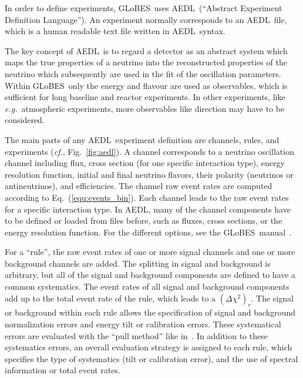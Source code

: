 \documentclass[12pt,a4paper]{article}
\newcommand{\eg}{{\it e.g.}}
\newcommand{\cf}{{\it cf.}}
\newcommand{\eq}{Eq.}
\newcommand{\fig}{Fig.}
\newcommand{\GLOBES}{{\sf GLoBES}}
\newcommand{\AEDL}{{\sf AEDL}}
\newcommand{\equ}[1]{\eq~(\ref{equ:#1})}
\newcommand{\figu}[1]{\fig~\ref{fig:#1}}
\begin{document}
In order to define experiments, \GLOBES\ uses \AEDL\ (``Abstract
Experiment Definition Language''). An experiment normally corresponds
to an \AEDL\ file, which is a human readable text file written 
in \AEDL\ syntax.

The key concept of \AEDL\ is to regard a detector as an abstract system
which maps the true properties of a neutrino into the reconstructed properties
of the neutrino which subsequently are used in the fit of the oscillation
parameters. Within \GLOBES\ only the energy and flavour are used as 
observables, which is
sufficient for long baseline and reactor experiments. In  other
experiments, like \eg\ atmospheric experiments, more observables like
direction may have to be considered.

The main parts of any \AEDL\ experiment definition are channels,
rules, and experiments (\cf, \figu{aedl}). A channel corresponds to a neutrino oscillation channel including flux, cross section (for one specific interaction type), energy resolution function, initial and final neutrino flavors, their polarity (neutrinos or antineutrinos), and efficiencies. The channel raw event rates are computed according to \equ{events_bin}. Each channel leads to the raw event rates for a 
specific interaction type. In \AEDL , many of the channel components
have to be defined or loaded from files before, such as fluxes, 
cross sections, or the energy resolution function. For the
different options, see the \GLOBES\ manual~\cite{Manual}.

For a ``rule'', the raw event rates of one or more signal channels and
one or more background channels are added. The splitting in signal and
background is arbitrary, but all of the signal and background components
are defined to have a common systematics. The event rates of all 
signal and background components add up to the total event rate of the
rule, which leads to a $(\Delta \chi^2)_r$. The signal or background
within each rule allows the specification of signal and background 
normalization errors and energy tilt or calibration errors. 
These systematical errors are evaluated with the ``pull method'' like 
in~\cite{Huber:2002mx,Fogli:2002pt}.  
In addition to these
systematics errors, an overall evaluation strategy is assigned 
to each rule, which specifies the type of systematics (tilt or calibration
error), and the use of spectral information or total event rates.   
\end{document}
